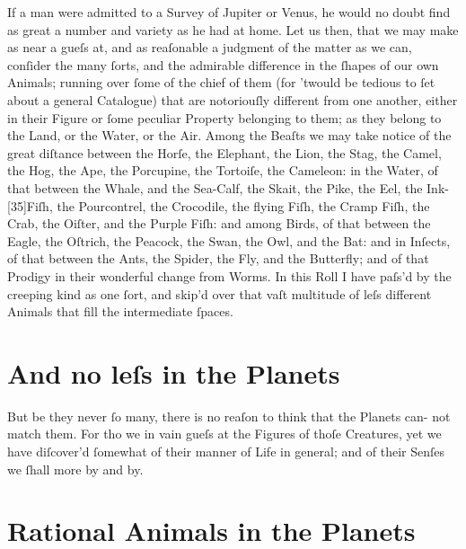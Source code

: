 \documentclass[letterpaper]{book}
\begin{document}
If a man were admitted to a Survey of Jupiter or Venus, he would no doubt
find as great a number and variety as he had at home. Let us then, that we
may make as near a gueſs at, and as reaſonable a judgment of the matter
as we can, conſider the many ſorts, and the admirable difference in the
ſhapes of our own Animals; running over ſome of the chief of them (for
'twould be tedious to ſet about a general Catalogue) that are notoriouſly
different from one another, either in their Figure or ſome peculiar Property
belonging to them; as they belong to the Land, or the Water, or the Air.
Among the Beaſts we may take notice of the great diſtance between the
Horſe, the Elephant, the Lion, the Stag, the Camel, the Hog, the Ape, the
Porcupine, the Tortoiſe, the Cameleon: in the Water, of that between the
Whale, and the Sea-Calf, the Skait, the Pike, the Eel, the Ink-[35]Fiſh, the
Pourcontrel, the Crocodile, the flying Fiſh, the Cramp Fiſh, the Crab, the
Oiſter, and the Purple Fiſh: and among Birds, of that between the Eagle,
the Oſtrich, the Peacock, the Swan, the Owl, and the Bat: and in Inſects,
of that between the Ants, the Spider, the Fly, and the Butterfly; and of that
Prodigy in their wonderful change from Worms. In this Roll I have paſs'd
by the creeping kind as one ſort, and skip'd over that vaſt multitude of leſs
different Animals that fill the intermediate ſpaces.


\section{And no leſs in the Planets}

But be they never ſo many, there is no reaſon to think that the Planets can-
not match them. For tho we in vain gueſs at the Figures of thoſe Creatures,
yet we have diſcover'd ſomewhat of their manner of Life in general; and of
their Senſes we ſhall more by and by.


\section{Rational Animals in the Planets}
\end{document}
